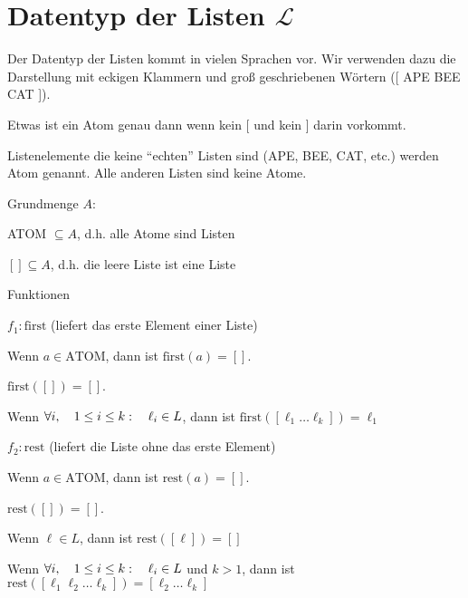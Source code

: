 \section{Datentyp der Listen $\mathcal{L}$}
Der Datentyp der Listen kommt in vielen Sprachen vor. Wir verwenden dazu die Darstellung mit eckigen Klammern und groß geschriebenen
Wörtern ([ APE BEE CAT ]).
\begin{defn}[Atom]
Etwas ist ein Atom genau dann wenn kein [ und kein ] darin vorkommt.

Listenelemente die keine ``echten'' Listen sind (APE, BEE, CAT, etc.) werden Atom genannt.
Alle anderen Listen sind keine Atome.
\end{defn}
\begin{defn} \quad
\begin{\whichitem}
\item Grundmenge $A$:
\begin{\whichitem}
\item ATOM $\subseteq A$, d.h. alle Atome sind Listen
\item $[ ] \subseteq A$, d.h. die leere Liste ist eine Liste
\end{\whichitem}
\item Funktionen
\begin{\whichenum}
\item $f_1: \text{first}$ (liefert das erste Element einer Liste)
\begin{\whichitem}
\item Wenn $a \in \text{ATOM}$, dann ist $\text{first}(a)=[ ]$.
\item $\text{first}([ ])=[ ]$.
\item Wenn $\text{$\forall$} i, \quad 1 \leq i \leq k: \quad \ell_i \in L$, dann ist $\text{first}([ \ell_1 \ldots \ell_k ])=\ell_1$
\end{\whichitem}
\item $f_2: \text{rest}$ (liefert die Liste ohne das erste Element)
\begin{\whichitem}
\item Wenn $a \in \text{ATOM}$, dann ist $\text{rest}(a)=[ ]$.
\item $\text{rest}([ ])=[ ]$.
\item Wenn $\ell \in L$, dann ist $\text{rest}([\ell])=[ ]$
\item Wenn $\text{$\forall$} i, \quad 1 \leq i \leq k: \quad \ell_i \in L$ und $k > 1$, dann ist $\text{rest}([ \ell_1 \ell_2 \ldots \ell_k ])=[ \ell_2 \ldots \ell_k ]$
\end{\whichitem}

\end{\whichenum}
\end{\whichitem}
\end{defn}
